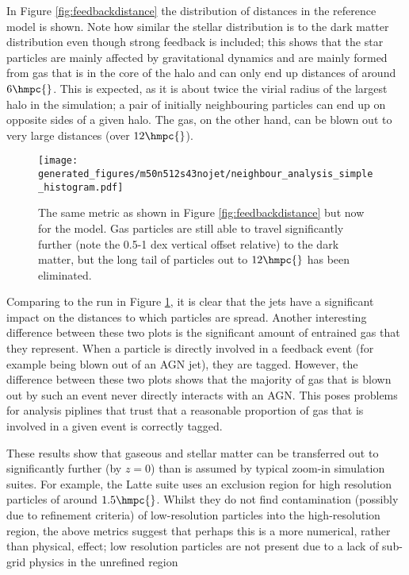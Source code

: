 In Figure \ref{fig:feedbackdistance} the distribution of distances in the
reference model is shown. Note how similar the stellar distribution is to the
dark matter distribution even though strong feedback is included; this shows
that the star particles are mainly affected by gravitational dynamics and 
are mainly formed from gas that is in the core of the halo and can only end up
distances of around $6 \hmpc{}$. This is expected, as it is about twice the virial
radius of the largest halo in the simulation; a pair of initially neighbouring
particles can end up on opposite sides of a given halo. The gas, on the
other hand, can be blown out to very large distances (over $12 \hmpc{}$).

\begin{figure}
    \centering
    \texttt{[image: generated\_figures/m50n512s43nojet/neighbour\_analysis\_simple\_histogram.pdf]}
    \caption{
        The same metric as shown in Figure \ref{fig:feedbackdistance} but
        now for the \nojet{} model. Gas particles are still able to travel
        significantly further (note the 0.5-1 dex vertical offset relative)
        to the dark matter, but the long tail of particles out to $12 \hmpc{}$
        has been eliminated.
    }
    \label{fig:nojetdistance}
\end{figure}

Comparing to the \nojet{} run in Figure \ref{fig:nojetdistance}, it is clear
that the jets have a significant impact on the distances to which particles
are spread. Another interesting difference between these two plots is the
significant amount of entrained gas that they represent. When a particle is
directly involved in a feedback event (for example being blown out of an AGN
jet), they are tagged. However, the difference between these two plots shows
that the majority of gas that is blown out by such an event never directly
interacts with an AGN. This poses problems for analysis piplines that trust
that a reasonable proportion of gas that is involved in a given event is
correctly tagged.

These results show that gaseous and stellar matter can be transferred out
to significantly further (by $z=0$) than is assumed by typical zoom-in simulation
suites. For example, the Latte \citep{Wetzel2016} suite uses an exclusion region
for high resolution particles of around $1.5 \hmpc{}$. Whilst they do not find
contamination (possibly due to refinement criteria) of low-resolution particles
into the high-resolution region, the above metrics suggest that perhaps this is
a more numerical, rather than physical, effect; low resolution particles are
not present due to a lack of sub-grid physics in the unrefined region
